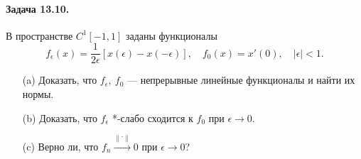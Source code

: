\documentclass[16pt]{article}
\newcommand\Norm[1]{\left\| #1 \right\|}
\begin{document}
\paragraph{Задача 13.10.} В пространстве $C^1[-1, 1]$ заданы функционалы
$$f_\epsilon(x) = \frac{1}{2\epsilon}[x(\epsilon) - x(-\epsilon)], \quad f_0(x) = x'(0), \quad |\epsilon| < 1.$$
\begin{itemize}
\item[(a)] Доказать, что $f_\epsilon, \ f_0$ --- непрерывные линейные функционалы и найти их нормы.
\item[(b)] Доказать, что $f_\epsilon$ *-слабо сходится к $f_0$ при $\epsilon \to 0$.
\item[(c)] Верно ли, что $f_n \overset{\Norm{\cdot}}{\to} 0$ при $\epsilon \to 0$? \\
\end{itemize}
\end{document}
